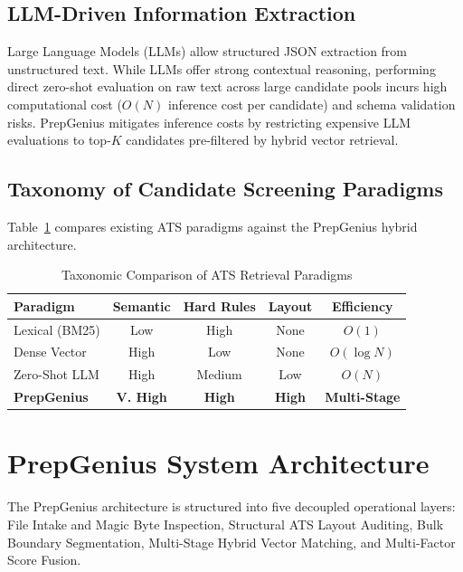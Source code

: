 \documentclass[conference]{IEEEtran}
\begin{document}
\subsection{LLM-Driven Information Extraction}
Large Language Models (LLMs) allow structured JSON extraction from unstructured text. While LLMs offer strong contextual reasoning, performing direct zero-shot evaluation on raw text across large candidate pools incurs high computational cost ($O(N)$ inference cost per candidate) and schema validation risks. PrepGenius mitigates inference costs by restricting expensive LLM evaluations to top-$K$ candidates pre-filtered by hybrid vector retrieval.

\subsection{Taxonomy of Candidate Screening Paradigms}
Table~\ref{tab:taxonomy} compares existing ATS paradigms against the PrepGenius hybrid architecture.

\begin{table}[htbp]
\caption{Taxonomic Comparison of ATS Retrieval Paradigms}
\label{tab:taxonomy}
\begin{center}
\begin{tabular}{lcccc}
\toprule
\textbf{Paradigm} & \textbf{Semantic} & \textbf{Hard Rules} & \textbf{Layout} & \textbf{Efficiency} \\
\midrule
Lexical (BM25) & Low & High & None & $O(1)$ \\
Dense Vector & High & Low & None & $O(\log N)$ \\
Zero-Shot LLM & High & Medium & Low & $O(N)$ \\
\textbf{PrepGenius} & \textbf{V. High} & \textbf{High} & \textbf{High} & \textbf{Multi-Stage} \\
\bottomrule
\end{tabular}
\end{center}
\end{table}

\section{PrepGenius System Architecture}
The PrepGenius architecture is structured into five decoupled operational layers: File Intake and Magic Byte Inspection, Structural ATS Layout Auditing, Bulk Boundary Segmentation, Multi-Stage Hybrid Vector Matching, and Multi-Factor Score Fusion.
\end{document}
